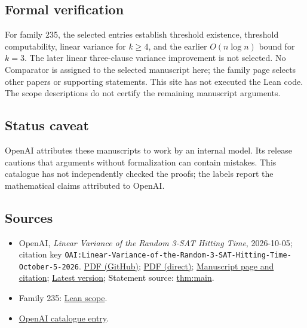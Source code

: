 \documentclass[11pt]{article}
\begin{document}
\subsection{Formal verification}
For family 235, the selected entries establish threshold existence, threshold computability, linear variance for $k\geq4$, and the earlier $O(n\log n)$ bound for $k=3$. The later linear three-clause variance improvement is not selected. No Comparator is assigned to the selected manuscript here; the family page selects other papers or supporting statements. This site has not executed the Lean code. The scope descriptions do not certify the remaining manuscript arguments.

\subsection{Status caveat}
OpenAI attributes these manuscripts to work by an internal model. Its release cautions that arguments without formalization can contain mistakes. This catalogue has not independently checked the proofs; the labels report the mathematical claims attributed to OpenAI.

\subsection{Sources}
\begin{itemize}
\item OpenAI, \emph{Linear Variance of the Random 3-SAT Hitting Time}, 2026-10-05; citation key \texttt{OAI:Linear-Variance-of-the-Random-3-SAT-Hitting-Time-October-5-2026}. \href{https://github.com/openai/math/blob/adc7f1241b42e322a6451854ab7e4b4c146bf78a/preprints/Linear-Variance-of-the-Random-3-SAT-Hitting-Time-October-5-2026/linear-variance-of-the-random-3-sat-hitting-time.pdf}{PDF (GitHub)}; \href{https://github.com/openai/math/raw/adc7f1241b42e322a6451854ab7e4b4c146bf78a/preprints/Linear-Variance-of-the-Random-3-SAT-Hitting-Time-October-5-2026/linear-variance-of-the-random-3-sat-hitting-time.pdf}{PDF (direct)}; \href{https://github.com/openai/math/blob/adc7f1241b42e322a6451854ab7e4b4c146bf78a/preprints/Linear-Variance-of-the-Random-3-SAT-Hitting-Time-October-5-2026/README.md}{Manuscript page and citation}; \href{https://github.com/openai/math/blob/main/preprints/Linear-Variance-of-the-Random-3-SAT-Hitting-Time-October-5-2026/linear-variance-of-the-random-3-sat-hitting-time.pdf}{Latest version}; Statement source: \href{https://github.com/openai/math/blob/adc7f1241b42e322a6451854ab7e4b4c146bf78a/preprints/Linear-Variance-of-the-Random-3-SAT-Hitting-Time-October-5-2026/build/source/main.tex\#L61}{thm:main}.
\item Family 235: \href{https://github.com/openai/math/blob/adc7f1241b42e322a6451854ab7e4b4c146bf78a/lean/docs/235.md}{Lean scope}.
\item \href{https://github.com/openai/math/blob/adc7f1241b42e322a6451854ab7e4b4c146bf78a/CONTENTS.md}{OpenAI catalogue entry}.
\end{itemize}
\end{document}

